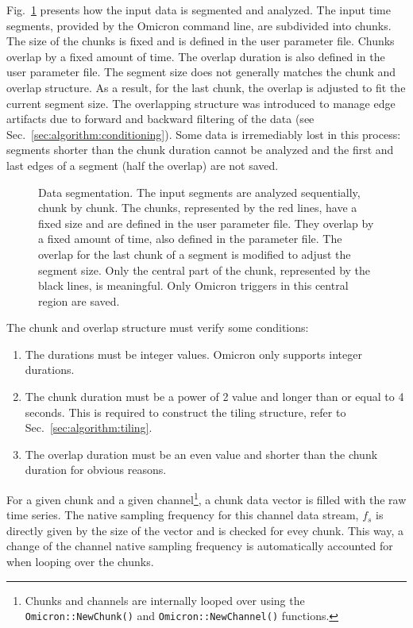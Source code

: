 Fig.~\ref{fig:segmentation} presents how the input data is segmented and analyzed. The input time segments, provided by the Omicron command line, are subdivided into chunks. The size of the chunks is fixed and is defined in the user parameter file. Chunks overlap by a fixed amount of time. The overlap duration is also defined in the user parameter file. The segment size does not generally matches the chunk and overlap structure. As a result, for the last chunk, the overlap is adjusted to fit the current segment size. The overlapping structure was introduced to manage edge artifacts due to forward and backward filtering of the data (see Sec.~\ref{sec:algorithm:conditioning}). Some data is irremediably lost in this process: segments shorter than the chunk duration cannot be analyzed and the first and last edges of a segment (half the overlap) are not saved.
\begin{figure}
  \center
  \caption{Data segmentation. The input segments are analyzed sequentially, chunk by chunk. The chunks, represented by the red lines, have a fixed size and are defined in the user parameter file. They overlap by a fixed amount of time, also defined in the parameter file. The overlap for the last chunk of a segment is modified to adjust the segment size. Only the central part of the chunk, represented by the black lines, is meaningful. Only Omicron triggers in this central region are saved.}
  \label{fig:segmentation}
\end{figure}

The chunk and overlap structure must verify some conditions:
\begin{enumerate}
\item The durations must be integer values. Omicron only supports integer durations.
\item The chunk duration must be a power of 2 value and longer than or equal to 4 seconds. This is required to construct the tiling structure, refer to Sec.~\ref{sec:algorithm:tiling}.
\item The overlap duration must be an even value and shorter than the chunk duration for obvious reasons.
\end{enumerate}

For a given chunk and a given channel\footnote{Chunks and channels are internally looped over using the \texttt{Omicron::NewChunk()} and \texttt{Omicron::NewChannel()} functions.}, a chunk data vector is filled with the raw time series. The native sampling frequency for this channel data stream, $f_s$ is directly given by the size of the vector and is checked for evey chunk. This way, a change of the channel native sampling frequency is automatically accounted for when looping over the chunks.


